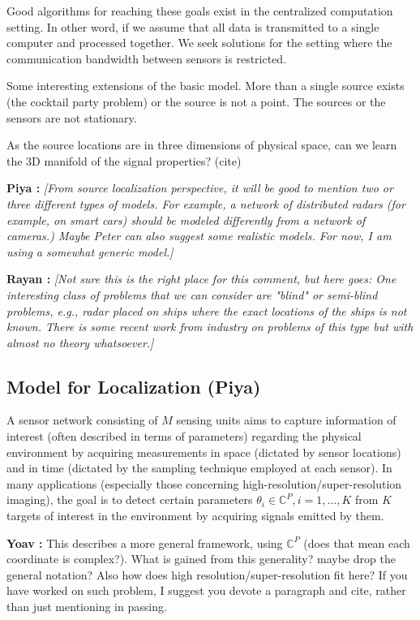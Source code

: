 \documentclass{article}
\newcommand{\comment}[3]{{\color{#1} {\bf #2 :} #3}}
\newcommand{\yoav}[1]{\comment{magenta}{Yoav}{#1}}
\newcommand{\piya}[1]{\comment{blue}{Piya}{#1}}
\newcommand{\rayan}[1]{\comment{red}{Rayan}{#1}}
\begin{document}
Good algorithms for reaching these goals exist in the centralized computation setting. In other word, if we assume that all data is  transmitted to a single computer and processed together. We seek solutions for the setting where the communication bandwidth between sensors is restricted.

Some interesting extensions of the basic model. More than a single source exists (the cocktail party problem) or the source is not a point. The sources or the sensors are not stationary. 

As the source locations are in three dimensions of physical space, can we learn the 3D manifold of the signal properties? (cite)


\piya{\em [From source localization perspective, it will be good to mention two or three different types of models. For example, a network of distributed radars (for example, on smart cars) should be modeled differently from a network of cameras.) Maybe Peter can also suggest some realistic models. For now, I am using a somewhat generic model.]}

\rayan{\em [Not sure this is the right place for this comment, but here goes: One interesting class of problems that we can consider are "blind" or semi-blind problems, e.g., radar placed on ships where the exact locations of the ships is not known. There is some recent work from industry on problems of this type but with almost no theory whatsoever.]}

\subsection{Model for Localization (Piya)} A sensor network consisting of $M$ sensing units aims to capture information of interest (often described in terms of parameters) regarding the physical environment by acquiring measurements in space (dictated by sensor locations) and in time (dictated by the sampling technique employed at each sensor). In many applications (especially those concerning high-resolution/super-resolution imaging), the goal is to detect certain parameters $\theta_i\in\mathbb{C}^P, i=1,\ldots,K$ from $K$ targets of interest in the environment by acquiring signals emitted by them. 

\yoav{This describes a more general framework, using $\mathbb{C}^P$ (does that mean each coordinate is complex?). What is gained from this generality? maybe drop the general notation? Also how does high resolution/super-resolution fit here? If you have worked on such problem, I suggest you devote a paragraph and cite, rather than just mentioning in passing.} 
\end{document}
